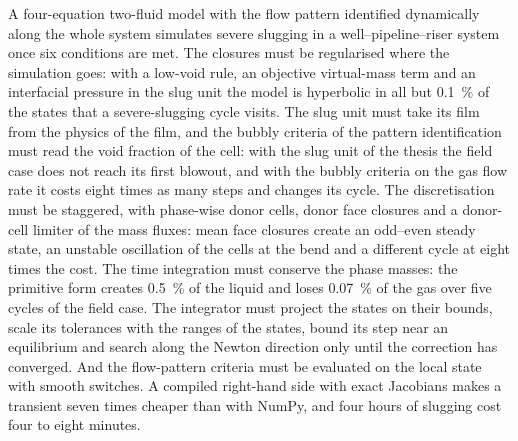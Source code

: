 \documentclass[a4paper,fleqn]{cas-sc}
\begin{document}
A four-equation two-fluid model with the flow pattern identified dynamically along the whole system simulates severe slugging in a well--pipeline--riser system once six conditions are met. The closures must be regularised where the simulation goes: with a low-void rule, an objective virtual-mass term and an interfacial pressure in the slug unit the model is hyperbolic in all but \SI{0.1}{\percent} of the states that a severe-slugging cycle visits. The slug unit must take its film from the physics of the film, and the bubbly criteria of the pattern identification must read the void fraction of the cell: with the slug unit of the thesis the field case does not reach its first blowout, and with the bubbly criteria on the gas flow rate it costs eight times as many steps and changes its cycle. The discretisation must be staggered, with phase-wise donor cells, donor face closures and a donor-cell limiter of the mass fluxes: mean face closures create an odd--even steady state, an unstable oscillation of the cells at the bend and a different cycle at eight times the cost. The time integration must conserve the phase masses: the primitive form creates \SI{0.5}{\percent} of the liquid and loses \SI{0.07}{\percent} of the gas over five cycles of the field case. The integrator must project the states on their bounds, scale its tolerances with the ranges of the states, bound its step near an equilibrium and search along the Newton direction only until the correction has converged. And the flow-pattern criteria must be evaluated on the local state with smooth switches. A compiled right-hand side with exact Jacobians makes a transient seven times cheaper than with NumPy, and four hours of slugging cost four to eight minutes.
\end{document}
